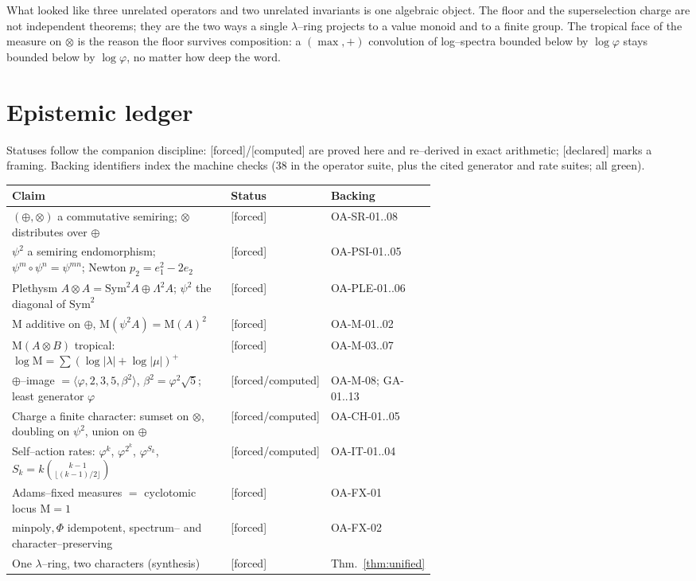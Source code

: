 \documentclass[11pt]{article}
\newcommand{\stag}[1]{{\small\textsf{\textcolor{tagcol}{[#1]}}}}
\theoremstyle{plain}
\theoremstyle{definition}
\newcommand{\psitwo}{\psi^{2}}
\newcommand{\dsum}{\oplus}
\newcommand{\dten}{\otimes}
\newcommand{\Mahler}{\mathrm{M}}
\newcommand{\Sym}{\mathrm{Sym}}
\begin{document}
\noindent What looked like three unrelated operators and two unrelated invariants is one algebraic object. The floor and the superselection charge are not independent theorems; they are the two ways a single $\lambda$--ring projects to a value monoid and to a finite group. The tropical face of the measure on $\dten$ is the reason the floor survives composition: a $(\max,+)$ convolution of log--spectra bounded below by $\log\varphi$ stays bounded below by $\log\varphi$, no matter how deep the word.

\section{Epistemic ledger}\label{sec:ledger}
Statuses follow the companion discipline: \stag{forced}/\stag{computed} are proved here and re--derived in exact arithmetic; \stag{declared} marks a framing. Backing identifiers index the machine checks ($38$ in the operator suite, plus the cited generator and rate suites; all green).

\begin{center}
\renewcommand{\arraystretch}{1.2}
\begin{tabular}{@{}p{0.62\linewidth}ll@{}}
\toprule
Claim & Status & Backing \\
\midrule
$(\dsum,\dten)$ a commutative semiring; $\dten$ distributes over $\dsum$ & \stag{forced} & OA-SR-01..08 \\
$\psitwo$ a semiring endomorphism; $\psi^m\!\circ\psi^n=\psi^{mn}$; Newton $p_2=e_1^2-2e_2$ & \stag{forced} & OA-PSI-01..05 \\
Plethysm $A\dten A=\Sym^2 A\dsum\Lambda^2 A$; $\psitwo$ the diagonal of $\Sym^2$ & \stag{forced} & OA-PLE-01..06 \\
$\Mahler$ additive on $\dsum$, $\Mahler(\psitwo A)=\Mahler(A)^2$ & \stag{forced} & OA-M-01..02 \\
$\Mahler(A\dten B)$ tropical: $\log\Mahler=\sum(\log|\lambda|+\log|\mu|)^+$ & \stag{forced} & OA-M-03..07 \\
$\dsum$--image $=\langle\varphi,2,3,5,\beta^2\rangle$, $\beta^2=\varphi^2\sqrt5$; least generator $\varphi$ & \stag{forced/computed} & OA-M-08; GA-01..13 \\
Charge a finite character: sumset on $\dten$, doubling on $\psitwo$, union on $\dsum$ & \stag{forced/computed} & OA-CH-01..05 \\
Self--action rates: $\varphi^k$, $\varphi^{2^k}$, $\varphi^{S_k}$, $S_k=k\binom{k-1}{\lfloor(k-1)/2\rfloor}$ & \stag{forced/computed} & OA-IT-01..04 \\
Adams--fixed measures $=$ cyclotomic locus $\Mahler=1$ & \stag{forced} & OA-FX-01 \\
$\mathrm{minpoly},\Phi$ idempotent, spectrum-- and character--preserving & \stag{forced} & OA-FX-02 \\
One $\lambda$--ring, two characters (synthesis) & \stag{forced} & Thm.~\ref{thm:unified} \\
\bottomrule
\end{tabular}
\end{center}
\end{document}
